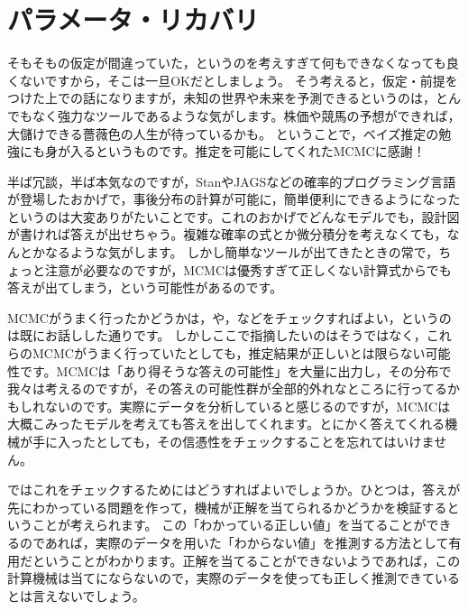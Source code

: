 \documentclass{ltjsbook}
\begin{document}
\section{パラメータ・リカバリ}
そもそもの仮定が間違っていた，というのを考えすぎて何もできなくなっても良くないですから，そこは一旦OKだとしましょう。
そう考えると，仮定・前提をつけた上での話になりますが，未知の世界や未来を予測できるというのは，とんでもなく強力なツールであるような気がします。株価や競馬の予想ができれば，大儲けできる薔薇色の人生が待っているかも。
ということで，ベイズ推定の勉強にも身が入るというものです。推定を可能にしてくれたMCMCに感謝！

半ば冗談，半ば本気なのですが，StanやJAGSなどの確率的プログラミング言語が登場したおかげで，事後分布の計算が可能に，簡単便利にできるようになったというのは大変ありがたいことです。これのおかげでどんなモデルでも，設計図が書ければ答えが出せちゃう。複雑な確率の式とか微分積分を考えなくても，なんとかなるような気がします。
しかし簡単なツールが出てきたときの常で，ちょっと注意が必要なのですが，MCMCは優秀すぎて正しくない計算式からでも答えが出てしまう，という可能性があるのです。

MCMCがうまく行ったかどうかは，や，などをチェックすればよい，というのは既にお話しした通りです。
しかしここで指摘したいのはそうではなく，これらのMCMCがうまく行っていたとしても，推定結果が正しいとは限らない可能性です。MCMCは「あり得そうな答えの可能性」を大量に出力し，その分布で我々は考えるのですが，その答えの可能性群が全部的外れなところに行ってるかもしれないのです。実際にデータを分析していると感じるのですが，MCMCは大概こみったモデルを考えても答えを出してくれます。とにかく答えてくれる機械が手に入ったとしても，その信憑性をチェックすることを忘れてはいけません。

ではこれをチェックするためにはどうすればよいでしょうか。ひとつは，答えが先にわかっている問題を作って，機械が正解を当てられるかどうかを検証するということが考えられます。
この「わかっている正しい値」を当てることができるのであれば，実際のデータを用いた「わからない値」を推測する方法として有用だということがわかります。正解を当てることができないようであれば，この計算機械は当てにならないので，実際のデータを使っても正しく推測できているとは言えないでしょう。
\end{document}
